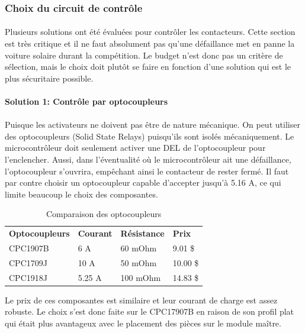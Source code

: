 	\subsubsection*{Choix du circuit de contrôle}
		\paragraph*{}
		Plusieurs solutions ont été évaluées pour contrôler les contacteurs. Cette section est très critique et il ne faut absolument pas qu'une défaillance met en panne la voiture solaire durant la compétition. Le budget n'est donc pas un critère de sélection, mais le choix doit plutôt se faire en fonction d'une solution qui est le plus sécuritaire possible.

		\paragraph*{Solution 1: Contrôle par optocoupleurs}
		\paragraph*{}			
		Puisque les activateurs ne doivent pas être de nature mécanique. On peut utiliser des optocoupleurs (Solid State Relays) puisqu'ils sont isolés mécaniquement. Le microcontrôleur doit seulement activer une DEL de l'optocoupleur pour l'enclencher. Aussi, dans l'éventualité où le microcontrôleur ait une défaillance, l'optocoupleur s'ouvrira, empêchant ainsi le contacteur de rester fermé. Il faut par contre choisir un optocoupleur capable d'accepter jusqu'à 5.16 A, ce qui limite beaucoup le choix des composantes.
		
		\begin{table}[H]
			\centering
			\caption{Comparaison des optocoupleurs}
			\label{ComparaisonOpto}
			\renewcommand{\arraystretch}{1.3}
			\begin{tabular}{|p{3cm}|p{3cm}|p{3cm}|p{3cm}|}
				\hline
				\textbf{Optocoupleurs} & \textbf{Courant} & \textbf{Résistance} & \textbf{Prix}
				\\ \hhline{|=|=|=|=|}
				CPC1907B & 6 A & 60 mOhm & 9.01 \$ \\ \hline
				CPC1709J & 10 A & 50 mOhm & 10.00 \$ \\ \hline
				CPC1918J & 5.25 A &	100 mOhm & 14.83 \$	\\ \hline
			\end{tabular}
		\end{table}
		
		Le prix de ces composantes est similaire et leur courant de charge est assez robuste. Le choix s'est donc faite sur le CPC17907B en raison de son profil plat qui était plus avantageux avec le placement des pièces sur le module maître.
		
